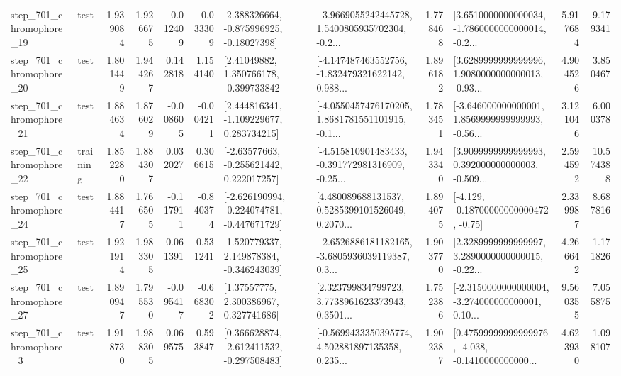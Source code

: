 \begin{tabular}{llrrrrllrlrr}
  step\_701\_chromophore\_19 &      test &      1.939084 &    1.926675 &     -0.012409 & -0.033309 &    [2.388326664, -0.875996925, -0.18027398] &  [-3.9669055242445728, 1.5400805935702304, -0.2... &       1.778468 &  [3.6510000000000034, -1.7860000000000014, -0.2... &            5.917684 &          9.179341 \\
  step\_701\_chromophore\_20 &      test &      1.801449 &    1.944267 &      0.142818 &  1.154140 &     [2.41049882, 1.350766178, -0.399733842] &  [-4.147487463552756, -1.832479321622142, 0.988... &       1.896182 &  [3.6289999999999996, 1.9080000000000013, -0.93... &            4.904526 &          3.850467 \\
  step\_701\_chromophore\_21 &      test &      1.884634 &    1.876029 &     -0.008605 & -0.004211 &    [2.444816341, -1.109229677, 0.283734215] &  [-4.0550457476170205, 1.8681781551101915, -0.1... &       1.783451 &  [-3.646000000000001, 1.8569999999999993, -0.56... &            3.121046 &          6.000378 \\
  step\_701\_chromophore\_22 &  training &      1.852280 &    1.884307 &      0.032027 &  0.306615 &    [-2.63577663, -0.255621442, 0.222017257] &  [-4.515810901483433, -0.391772981316909, -0.25... &       1.943340 &  [3.9099999999999993, 0.392000000000003, -0.509... &            2.594592 &         10.574388 \\
  step\_701\_chromophore\_24 &      test &      1.884417 &    1.766505 &     -0.117911 & -0.840374 &  [-2.626190994, -0.224074781, -0.447671729] &  [4.480089688131537, 0.5285399101526049, 0.2070... &       1.894075 &              [-4.129, -0.18700000000000472, -0.75] &            2.339987 &          8.687816 \\
  step\_701\_chromophore\_25 &      test &      1.921914 &    1.983305 &      0.061391 &  0.531241 &    [1.520779337, 2.149878384, -0.346243039] &  [-2.6526886181182165, -3.6805936039119387, 0.3... &       1.903770 &  [2.3289999999999997, 3.2890000000000015, -0.22... &            4.266642 &          1.171826 \\
  step\_701\_chromophore\_27 &      test &      1.890947 &    1.795530 &     -0.095417 & -0.668302 &      [1.37557775, 2.300386967, 0.327741686] &  [2.323799834799723, 3.7738961623373943, 0.3501... &       1.752386 &  [-2.3150000000000004, -3.274000000000001, 0.10... &            9.560355 &          7.055875 \\
   step\_701\_chromophore\_3 &      test &      1.918730 &    1.988305 &      0.069575 &  0.593847 &   [0.366628874, -2.612411532, -0.297508483] &  [-0.5699433350395774, 4.502881897135358, 0.235... &       1.902387 &  [0.47599999999999976, -4.038, -0.1410000000000... &            4.623930 &          1.098107 \\

\end{tabular}
